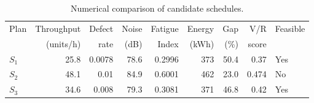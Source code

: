 \begin{table}[htbp]
\centering
\caption{Numerical comparison of candidate schedules.}
\label{tab:numerical-sim}
\small
\begin{tabular}{@{}lrrrrrrrl@{}}
\toprule
Plan & Throughput & Defect & Noise & Fatigue & Energy & Gap & V/R & Feasible \\
     & (units/h)  & rate   & (dB)  & Index   & (kWh)  & (\%) & score &         \\
\midrule
$S_{1}$ & 25.8 & 0.0078 & 78.6 & 0.2996 & 373 & 50.4 & 0.37 & Yes \\
$S_{2}$ & 48.1 & 0.01 & 84.9 & 0.6001 & 462 & 23.0 & 0.474 & No \\
$S_{3}$ & 34.6 & 0.008 & 79.3 & 0.3081 & 371 & 46.8 & 0.42 & Yes \\
\bottomrule
\end{tabular}
\end{table}
